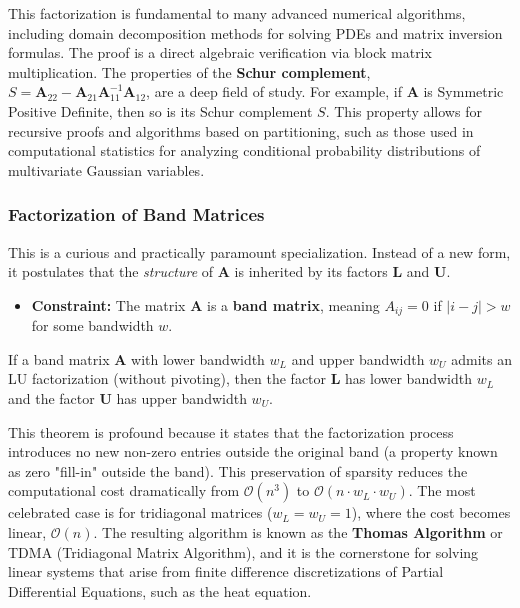 \begin{remark}
This factorization is fundamental to many advanced numerical algorithms, including domain decomposition methods for solving PDEs and matrix inversion formulas. The proof is a direct algebraic verification via block matrix multiplication. The properties of the \textbf{Schur complement}, $S = \mathbf{A}_{22} - \mathbf{A}_{21}\mathbf{A}_{11}^{-1}\mathbf{A}_{12}$, are a deep field of study. For example, if $\mathbf{A}$ is Symmetric Positive Definite, then so is its Schur complement $S$. This property allows for recursive proofs and algorithms based on partitioning, such as those used in computational statistics for analyzing conditional probability distributions of multivariate Gaussian variables.
\end{remark}

\subsubsection{Factorization of Band Matrices}
This is a curious and practically paramount specialization. Instead of a new form, it postulates that the \textit{structure} of $\mathbf{A}$ is inherited by its factors $\mathbf{L}$ and $\mathbf{U}$.

\begin{itemize}
    \item \textbf{Constraint:} The matrix $\mathbf{A}$ is a \textbf{band matrix}, meaning $A_{ij} = 0$ if $|i-j| > w$ for some bandwidth $w$.
\end{itemize}

\begin{theorem}
If a band matrix $\mathbf{A}$ with lower bandwidth $w_L$ and upper bandwidth $w_U$ admits an LU factorization (without pivoting), then the factor $\mathbf{L}$ has lower bandwidth $w_L$ and the factor $\mathbf{U}$ has upper bandwidth $w_U$.
\end{theorem}

\begin{remark}
This theorem is profound because it states that the factorization process introduces no new non-zero entries outside the original band (a property known as zero "fill-in" outside the band). This preservation of sparsity reduces the computational cost dramatically from $\mathcal{O}(n^3)$ to $\mathcal{O}(n \cdot w_L \cdot w_U)$. The most celebrated case is for tridiagonal matrices ($w_L=w_U=1$), where the cost becomes linear, $\mathcal{O}(n)$. The resulting algorithm is known as the \textbf{Thomas Algorithm} or TDMA (Tridiagonal Matrix Algorithm), and it is the cornerstone for solving linear systems that arise from finite difference discretizations of Partial Differential Equations, such as the heat equation.
\end{remark}

